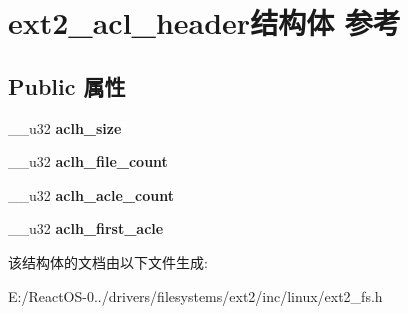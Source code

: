 \hypertarget{structext2__acl__header}{}\section{ext2\+\_\+acl\+\_\+header结构体 参考}
\label{structext2__acl__header}
\subsection*{Public 属性}
\begin{DoxyCompactItemize}
\item 
\mbox{\label{structext2__acl__header_a77ac25588f30d82f6002ace85cf39413}} 
\+\_\+\+\_\+u32 {\bfseries aclh\+\_\+size}
\item 
\mbox{\label{structext2__acl__header_ad7eb4409afa47d63578f1aad6d931361}} 
\+\_\+\+\_\+u32 {\bfseries aclh\+\_\+file\+\_\+count}
\item 
\mbox{\label{structext2__acl__header_a080367044c9e3974dcdd4d0196f16f87}} 
\+\_\+\+\_\+u32 {\bfseries aclh\+\_\+acle\+\_\+count}
\item 
\mbox{\label{structext2__acl__header_aaba2717af0d300c4aeeb8d89eb9ebbdd}} 
\+\_\+\+\_\+u32 {\bfseries aclh\+\_\+first\+\_\+acle}
\end{DoxyCompactItemize}


该结构体的文档由以下文件生成\+:\begin{DoxyCompactItemize}
\item 
E\+:/\+React\+O\+S-\/0../drivers/filesystems/ext2/inc/linux/ext2\+\_\+fs.\+h\end{DoxyCompactItemize}
